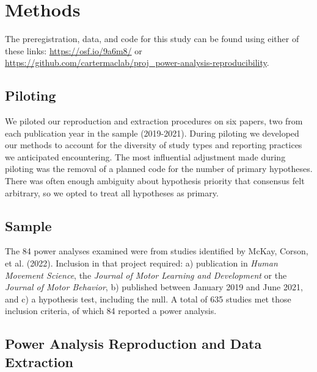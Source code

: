 \documentclass[
  doc, donotrepeattitle,floatsintext]{apa7}
\begin{document}
\hypertarget{methods}{%
\section{Methods}\label{methods}}

The preregistration, data, and code for this study can be found using either of these links: \url{https://osf.io/9a6m8/} or \url{https://github.com/cartermaclab/proj_power-analysis-reproducibility}.

\hypertarget{piloting}{%
\subsection{Piloting}\label{piloting}}

We piloted our reproduction and extraction procedures on six papers, two from each publication year in the sample (2019-2021). During piloting we developed our methods to account for the diversity of study types and reporting practices we anticipated encountering. The most influential adjustment made during piloting was the removal of a planned code for the number of primary hypotheses. There was often enough ambiguity about hypothesis priority that consensus felt arbitrary, so we opted to treat all hypotheses as primary.

\hypertarget{sample}{%
\subsection{Sample}\label{sample}}

The 84 power analyses examined were from studies identified by McKay, Corson, et al. (2022). Inclusion in that project required: a) publication in \emph{Human Movement Science}, the \emph{Journal of Motor Learning and Development} or the \emph{Journal of Motor Behavior}, b) published between January 2019 and June 2021, and c) a hypothesis test, including the null. A total of 635 studies met those inclusion criteria, of which 84 reported a power analysis.

\hypertarget{power-analysis-reproduction-and-data-extraction}{%
\subsection{Power Analysis Reproduction and Data Extraction}\label{power-analysis-reproduction-and-data-extraction}}
\end{document}
